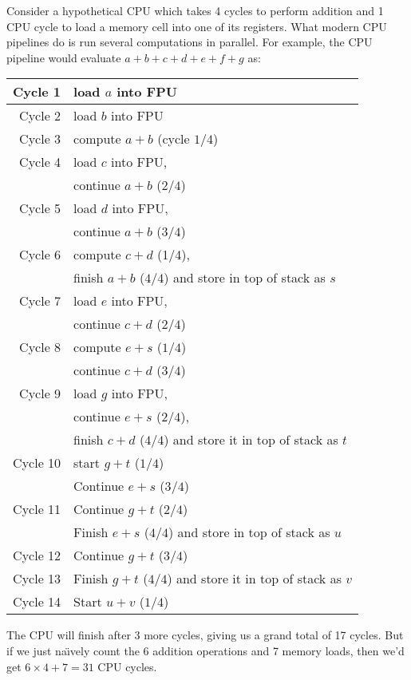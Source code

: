 \begin{ex}
  Consider a hypothetical CPU which takes 4 cycles to perform
  addition and 1 CPU cycle to load a memory cell into one of its
  registers. What modern CPU pipelines do is run several computations in
  parallel. For example, the CPU pipeline would evaluate $a+b+c+d+e+f+g$ as:
  \begin{center}
    \begin{longtable}{r|l}
      Cycle 1  & load $a$ into FPU\\\hline
      Cycle 2  & load $b$ into FPU\\\hline
      Cycle 3  & compute $a+b$ (cycle $1/4$)\\\hline
      Cycle 4  & load $c$ into FPU,\\
               & continue $a+b$ ($2/4$)\\\hline
      Cycle 5  & load $d$ into FPU,\\
               & continue $a+b$ ($3/4$)\\\hline
      Cycle 6  & compute $c+d$ (1/4),\\
               & finish $a+b$ ($4/4$) and store in top of stack as $s$\\\hline
      Cycle 7  & load $e$ into FPU,\\
               & continue $c+d$ ($2/4$)\\\hline
      Cycle 8  & compute $e+s$ ($1/4$)\\
               & continue $c+d$ ($3/4$)\\\hline
      Cycle 9  & load $g$ into FPU,\\
               & continue $e+s$ ($2/4$),\\
               & finish $c+d$ ($4/4$) and store it in top of stack as $t$\\\hline
      Cycle 10 & start $g+t$ ($1/4$)\\
               & Continue $e+s$ ($3/4$)\\\hline
      Cycle 11 & Continue $g+t$ ($2/4$)\\
               & Finish $e+s$ ($4/4$) and store in top of stack as $u$\\\hline
      Cycle 12 & Continue $g+t$ ($3/4$)\\\hline
      Cycle 13 & Finish $g+t$ ($4/4$) and store it in top of stack as $v$\\\hline
      Cycle 14 & Start $u+v$ ($1/4$)
    \end{longtable}
  \end{center}
  The CPU will finish after 3 more cycles, giving us a grand total of 17
  cycles. But if we just na\"{\i}vely count the 6 addition operations
  and 7 memory loads, then we'd get $6\times4 + 7=31$ CPU cycles.
\end{ex}
